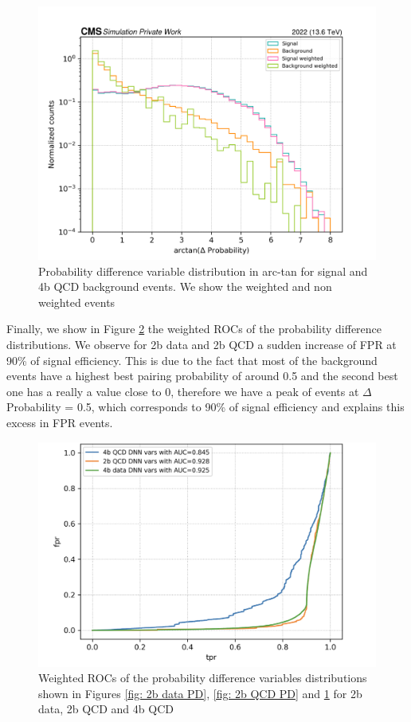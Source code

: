\begin{figure}[hbt]
    \centering
    \includegraphics[width=0.7\linewidth]{Images/7.S:B/Prob diff/4b QCD arctan.png}
    \caption{Probability difference variable distribution in arc-tan for signal and 4b QCD background events. We show the weighted and non weighted events}
    \label{fig: 4b QCD PD}
\end{figure}

Finally, we show in Figure \ref{fig: ROC PD} the weighted ROCs of the probability difference distributions. We observe for 2b data and 2b QCD a sudden increase of FPR at 90\% of signal efficiency. This is due to the fact that most of the background events have a highest best pairing probability of around 0.5 and the second best one has a really a value close to 0, therefore we have a peak of events at $\Delta$Probability = 0.5, which corresponds to 90\% of signal efficiency and explains this excess in FPR events.

\begin{figure}
    \centering
    \includegraphics[width=0.7\linewidth]{Images/7.S:B/Prob diff/Probability difference ROC curve.png}
    \caption{Weighted ROCs of the probability difference variables distributions shown in Figures \ref{fig: 2b data PD}, \ref{fig: 2b QCD PD} and \ref{fig: 4b QCD PD} for 2b data, 2b QCD and 4b QCD}
    \label{fig: ROC PD}
\end{figure}

